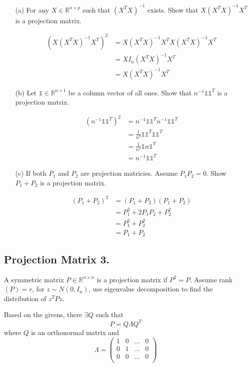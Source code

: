\documentclass{tufte-book}
\begin{document}
\begin{enumerate}

\item[(a)] For any $X \in \mathbb{R}^{n \times p}$ such that $(X^TX)^{-1}$ exists.  Show that $X(X^TX)^{-1}X^T$ is a projection matrix.

\begin{align*}
(X(X^TX)^{-1}X^T)^2 &= X(X^TX)^{-1}X^TX(X^TX)^{-1}X^T\\
&= X I_n (X^TX)^{-1}X^T\\
&= X(X^TX)^{-1}X^T
\end{align*}

\item[(b)] Let $\mathbb{1} \in \mathbb{R}^{n \times 1}$ be a column vector of all ones.  Show that $n^{-1} \mathbb{1}\mathbb{1}^T$ is a projection matrix.

\begin{align*}
(n^{-1} \mathbb{1}\mathbb{1}^T)^2 &= n^{-1} \mathbb{1}\mathbb{1}^Tn^{-1} \mathbb{1}\mathbb{1}^T\\
&= \frac{1}{n^2} \mathbb{1}\mathbb{1}^T \mathbb{1}\mathbb{1}^T\\
&= \frac{1}{n^2} \mathbb{1}n\mathbb{1}^T\\
&= n^{-1} \mathbb{1}\mathbb{1}^T
\end{align*}

\item[(c)] If both $P_1$ and $P_2$ are projection matricies.  Assume $P_1P_2=0$.  Show $P_1+P_2$ is a projection matrix.

\begin{align*}
(P_1+P_2)^2 &= (P_1+P_2)(P_1+P_2)\\
&=P_1^2 + 2P_1P_2 + P_2^2\\
&=P_1^2 + P_2^2\\
&=P_1 + P_2
\end{align*}

\end{enumerate}

\subsection{Projection Matrix 3.} A symmetric matrix $P\in \mathbb{R}^{n\times n}$ is a projection matrix if $P^2=P$.  Assume rank$(P)=r$, for $z \sim N(0, I_n)$, use eigenvalue decomposition to find the distribution of $z^TPz$.

Based on the givens, there $\exists Q$ such that
\[ P = Q \Lambda Q^T \]
where $Q$ is an orthonormal matrix and
\[ \Lambda = \begin{pmatrix}
1 & 0 & \dots & 0\\
0 & 1 & \dots & 0\\
0 & 0 & \dots & 0\\
\end{pmatrix}
\]
\end{document}
